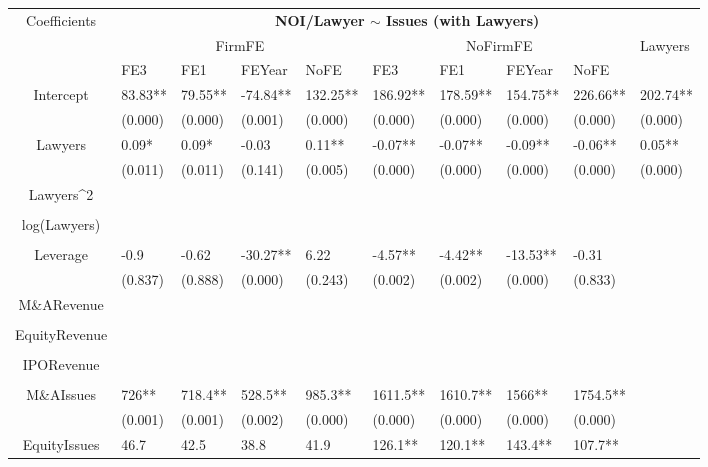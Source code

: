 \documentclass{article}
\begin{document}
\begin{table}[H]
\centering
\begin{tabular}{|clllllllll|}
\hline
\multirow{3}{*}{Coefficients} & \multicolumn{9}{c|}{\textbf{NOI/Lawyer $\sim$ Issues (with Lawyers)}} \\
\cline{2-10}
& \multicolumn{4}{c}{FirmFE} & \multicolumn{4}{c}{NoFirmFE} & \multirow{2}{*}{Lawyers} \\
\cline{2-9}
& FE3 & FE1 & FEYear & NoFE & FE3 & FE1 & FEYear & NoFE &  \\
\hline
 
Intercept & 83.83** & 79.55** & -74.84** & 132.25** & 186.92** & 178.59** & 154.75** & 226.66** & 202.74** \\ 
   & (0.000) & (0.000) & (0.001) & (0.000) & (0.000) & (0.000) & (0.000) & (0.000) & (0.000) \\ 
  Lawyers & 0.09* & 0.09* & -0.03 & 0.11** & -0.07** & -0.07** & -0.09** & -0.06** & 0.05** \\ 
   & (0.011) & (0.011) & (0.141) & (0.005) & (0.000) & (0.000) & (0.000) & (0.000) & (0.000) \\ 
  Lawyers^2 &  &  &  &  &  &  &  &  &  \\ 
   &  &  &  &  &  &  &  &  &  \\ 
  log(Lawyers) &  &  &  &  &  &  &  &  &  \\ 
   &  &  &  &  &  &  &  &  &  \\ 
  Leverage & -0.9 & -0.62 & -30.27** & 6.22 & -4.57** & -4.42** & -13.53** & -0.31 &  \\ 
   & (0.837) & (0.888) & (0.000) & (0.243) & (0.002) & (0.002) & (0.000) & (0.833) &  \\ 
  M\&ARevenue &  &  &  &  &  &  &  &  &  \\ 
   &  &  &  &  &  &  &  &  &  \\ 
  EquityRevenue &  &  &  &  &  &  &  &  &  \\ 
   &  &  &  &  &  &  &  &  &  \\ 
  IPORevenue &  &  &  &  &  &  &  &  &  \\ 
   &  &  &  &  &  &  &  &  &  \\ 
  M\&AIssues & 726** & 718.4** & 528.5** & 985.3** & 1611.5** & 1610.7** & 1566** & 1754.5** &  \\ 
   & (0.001) & (0.001) & (0.002) & (0.000) & (0.000) & (0.000) & (0.000) & (0.000) &  \\ 
  EquityIssues & 46.7 & 42.5 & 38.8 & 41.9 & 126.1** & 120.1** & 143.4** & 107.7** &  \\ 

\end{tabular}
\end{table}
\end{document}
